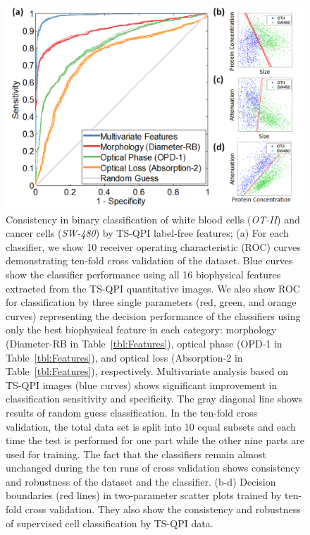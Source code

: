 \documentclass[aps,pra,reprint,superscriptaddress]{revtex4-1}
\begin{document}
\begin{figure}
\includegraphics[scale=0.2]{FigureOTSWROC.jpg}
\caption{\label{fig:OTSWROC} Consistency in binary classification of white blood cells (\textit{OT-II}) and cancer cells (\textit{SW-480}) by TS-QPI label-free features; (a) For each classifier, we show 10 receiver operating characteristic (ROC) curves demonstrating ten-fold cross validation of the dataset. Blue curves show the classifier performance using all 16 biophysical features extracted from the TS-QPI quantitative images. We also show ROC for classification by three single parameters (red, green, and orange curves) representing the decision performance of the classifiers using only the best biophysical feature in each category: morphology (Diameter-RB in Table~\ref{tbl:Features}), optical phase (OPD-1 in Table~\ref{tbl:Features}), and optical loss (Absorption-2 in Table~\ref{tbl:Features}), respectively. Multivariate analysis based on TS-QPI images (blue curves) shows significant improvement in classification sensitivity and specificity. The gray diagonal line shows results of random guess classification. In the ten-fold cross validation, the total data set is split into 10 equal subsets and each time the test is performed for one part while the other nine parts are used for training. The fact that the classifiers remain almost unchanged during the ten runs of cross validation shows consistency and robustness of the dataset and the classifier. (b-d) Decision boundaries (red lines) in two-parameter scatter plots trained by ten-fold cross validation. They also show the consistency and robustness of supervised cell classification by TS-QPI data.}
\end{figure}
\end{document}
